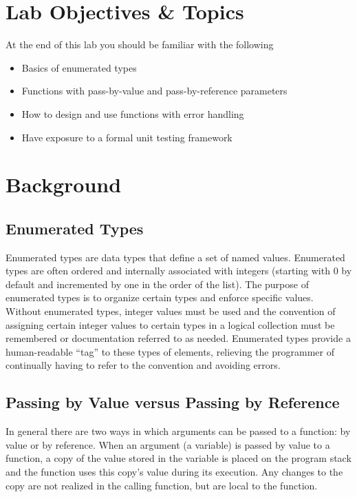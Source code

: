 \documentclass[12pt]{scrartcl}
\begin{document}
\section{Lab Objectives \& Topics}
At the end of this lab you should be familiar with the following
\begin{itemize}
  \item Basics of enumerated types
  \item Functions with pass-by-value and pass-by-reference parameters
  \item How to design and use functions with error handling
  \item Have exposure to a formal unit testing framework 
\end{itemize}

\section{Background}

\subsection*{Enumerated Types}

Enumerated types are data types that define a set of named values.  
Enumerated types are often ordered and internally associated with 
integers (starting with 0 by default and incremented by one in the 
order of the list).  The purpose of enumerated types is to organize 
certain types and enforce specific values.  Without enumerated types, 
integer values must be used and the convention of assigning certain 
integer values to certain types in a logical collection must be remembered 
or documentation referred to as needed.  Enumerated types provide 
a human-readable ``tag'' to these types of elements, relieving the 
programmer of continually having to refer to the convention and avoiding 
errors.

\subsection*{Passing by Value versus Passing by Reference}

In general there are two ways in which arguments can be passed to 
a function: by value or by reference. When an argument (a variable) 
is passed by value to a function, a copy of the value stored in the 
variable is placed on the program stack and the function uses this 
copy's value during its execution.  Any changes to the copy are not 
realized in the calling function, but are local to the function.
\end{document}
